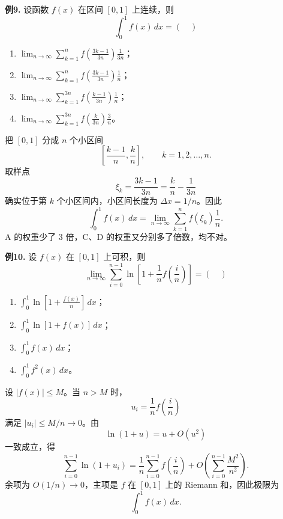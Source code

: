 \begin{problemblock}
\textbf{例9.} 设函数 \(f(x)\) 在区间 \([0,1]\) 上连续，则
\[
\int_0^1 f(x)\,dx=(\quad)
\]
\begin{enumerate}[label=\Alph*., leftmargin=2.2em]
\item \(\displaystyle \lim_{n\to\infty}\sum_{k=1}^n f\left(\frac{3k-1}{3n}\right)\frac1{3n}\)；
\item \(\displaystyle \lim_{n\to\infty}\sum_{k=1}^n f\left(\frac{3k-1}{3n}\right)\frac1n\)；
\item \(\displaystyle \lim_{n\to\infty}\sum_{k=1}^{3n} f\left(\frac{k-1}{3n}\right)\frac1n\)；
\item \(\displaystyle \lim_{n\to\infty}\sum_{k=1}^{3n} f\left(\frac{k}{3n}\right)\frac3n\)。
\end{enumerate}
\end{problemblock}
\begin{solutionblock}
把 \([0,1]\) 分成 \(n\) 个小区间
\[
\left[\frac{k-1}{n},\frac{k}{n}\right],\qquad k=1,2,\dots,n.
\]
取样点
\[
\xi_k=\frac{3k-1}{3n}=\frac{k}{n}-\frac1{3n}
\]
确实位于第 \(k\) 个小区间内，小区间长度为 \(\Delta x=1/n\)。因此
\[
\int_0^1f(x)\,dx
=\lim_{n\to\infty}\sum_{k=1}^n f(\xi_k)\frac1n.
\]
A 的权重少了 \(3\) 倍，C、D 的权重又分别多了倍数，均不对。
\end{solutionblock}

\begin{problemblock}
\textbf{例10.} 设 \(f(x)\) 在 \([0,1]\) 上可积，则
\[
\lim_{n\to\infty}\sum_{i=0}^{n-1}
\ln\left[1+\frac1n f\left(\frac in\right)\right]
=(\quad)
\]
\begin{enumerate}[label=\Alph*., leftmargin=2.2em]
\item \(\displaystyle\int_0^1 \ln\left[1+\frac{f(x)}n\right]\,dx\)；
\item \(\displaystyle\int_0^1 \ln[1+f(x)]\,dx\)；
\item \(\displaystyle\int_0^1 f(x)\,dx\)；
\item \(\displaystyle\int_0^1 f^2(x)\,dx\)。
\end{enumerate}
\end{problemblock}
\begin{solutionblock}
设 \(|f(x)|\le M\)。当 \(n>M\) 时，
\[
u_i=\frac1n f\left(\frac in\right)
\]
满足 \(|u_i|\le M/n\to0\)。由
\[
\ln(1+u)=u+O(u^2)
\]
一致成立，得
\[
\sum_{i=0}^{n-1}\ln(1+u_i)
=\frac1n\sum_{i=0}^{n-1}f\left(\frac in\right)
+O\left(\sum_{i=0}^{n-1}\frac{M^2}{n^2}\right).
\]
余项为 \(O(1/n)\to0\)，主项是 \(f\) 在 \([0,1]\) 上的 Riemann 和，因此极限为
\[
\int_0^1 f(x)\,dx.
\]
\end{solutionblock}


